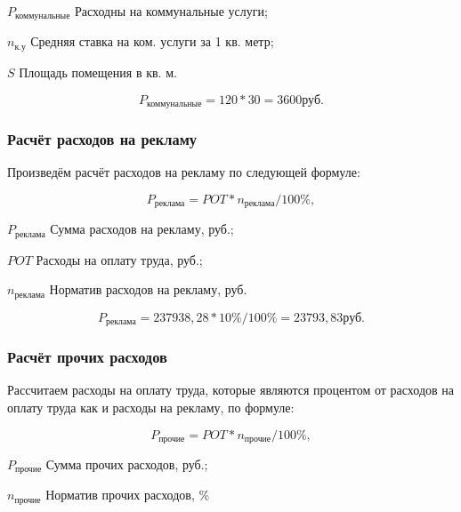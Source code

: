 \begin{eqexpl}[25mm]
    \item{$P_\text{коммунальные}$} Расходны на коммунальные услуги;
    \item{$n_\text{к.у}$} Средняя ставка на ком. услуги за 1 кв. метр;
    \item{$S$} Площадь помещения в кв. м.
\end{eqexpl}

\begin{equation*}
    P_\text{коммунальные} = 120 * 30 = 3600 \text{руб}.
\end{equation*}

\subsubsection{Расчёт расходов на рекламу}

Произведём расчёт расходов на рекламу по следующей формуле:

\begin{equation}
    P_\text{реклама} = POT * n_\text{реклама} / 100\%,
\end{equation}

\begin{eqexpl}[25mm]
    \item{$P_\text{реклама}$} Сумма расходов на рекламу, руб.;
    \item{$POT$} Расходы на оплату труда, руб.;
    \item{$n_\text{реклама}$} Норматив расходов на рекламу, руб.
\end{eqexpl}

\begin{equation*}
    P_\text{реклама} = 237938,28 * 10\% / 100\% = 23793,83 \text{руб}.
\end{equation*}

\subsubsection{Расчёт прочих расходов}

Рассчитаем расходы на оплату труда, которые являются процентом от расходов
на оплату труда как и расходы на рекламу, по формуле:

\begin{equation}
    P_\text{прочие} = POT * n_\text{прочие} / 100\%,
\end{equation}

\begin{eqexpl}[25mm]
    \item{$P_\text{прочие}$} Сумма прочих расходов, руб.;
    \item{$n_\text{прочие}$} Норматив прочих расходов, \%
\end{eqexpl}

